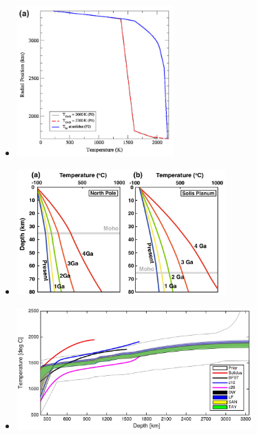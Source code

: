 \begin{itemize}
\item {}

\begin{center}
\includegraphics[width=6cm]{images/mars/temperature/roar12}
\end{center}

\item {}

\begin{center}
\includegraphics[width=8cm]{images/mars/temperature/azka17}
\end{center}

\item {}

\begin{center}
\includegraphics[width=9cm]{images/mars/temperature/khlr18}
\end{center}


\end{itemize}
